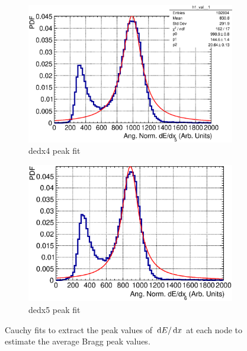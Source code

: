\begin{figure}[t]
\begin{subfigure}{\dbfigwid\textwidth}
         \includegraphics[width=\textwidth]{figures/sel/fig54e.eps}
         \caption{dedx4 peak fit}
         \label{subfig:dedx4-peak}
    \end{subfigure}
    \begin{subfigure}{\dbfigwid\textwidth}
         \includegraphics[width=\textwidth]{figures/sel/fig54f.eps}
         \caption{dedx5 peak fit}
         \label{subfig:dedx5-peak}
    \end{subfigure}
    \caption{Cauchy fits to extract the peak values of $\,\textrm{d}E/\,\textrm{d}x$ at each node to estimate the average Bragg peak values.}
    \label{fig:esc-andedx-peaks}
  \end{figure}

